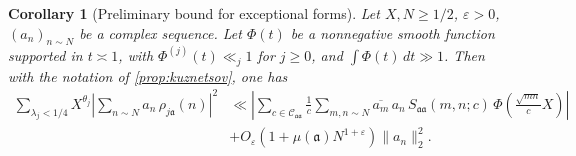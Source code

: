 \documentclass[reqno,11pt]{amsart}
\newtheorem{knowncorollary}[knowntheorem]{Corollary}
\theoremstyle{remark}
\numberwithin{equation}{section}
\newcommand{\mC}{\mathcal{C}}
\newcommand{\ma}{\mathfrak{a}}
\newcommand{\eps}{\varepsilon}
\renewcommand{\bar}{\overline}
\begin{document}
\begin{knowncorollary}[Preliminary bound for exceptional forms] \label{cor:exc-bound}
Let $X, N \ge 1/2$, $\eps > 0$, $(a_n)_{n \sim N}$ be a complex sequence. Let $\Phi(t)$ be a nonnegative smooth function supported in $t \asymp 1$, with $\Phi^{(j)}(t) \ll_j 1$ for $j \ge 0$, and $\int \Phi(t)\, dt \gg 1$. Then with the notation of \cref{prop:kuznetsov}, one has
\begin{equation} \label{eq:exceptional-bound}
\begin{aligned}
    \sum_{\lambda_j < 1/4} X^{\theta_j} \left\vert \sum_{n \sim N} a_n\, \rho_{j\ma}(n) \right\vert^2 
    &\ll 
    \left\vert \sum_{c \in \mC_{\ma\ma}} \frac{1}{c} 
    \sum_{m,n \sim N} \bar{a_m}\, a_n\, S_{\ma \ma}(m, n; c)\, \Phi\left(\frac{\sqrt{mn}}{c} X \right) \right\vert
    \\
    &+ 
    O_\eps\left(1 + \mu(\ma) N^{1+\eps}\right) \|a_n\|_2^2.
\end{aligned}
\end{equation}
\end{knowncorollary}
\end{document}
